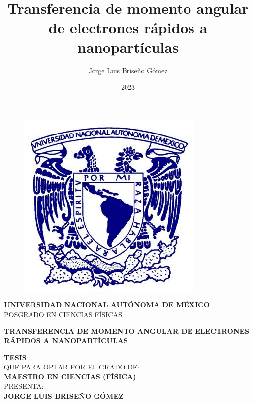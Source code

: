 \documentclass[11pt,twoside]{book}
\date{2023}
\title{ Transferencia de momento angular de electrones rápidos a nanopartículas}
\author{Jorge Luis Briseño Gómez}
\begin{document}
\begin{toexclude}
%
\begin{titlepage}
	\begin{center}
		
		\begin{figure}
			\centering
			\includegraphics[scale=.4]{17-imagenes/Unam.png}
		\end{figure}
		
		\begin{spacing}{1.5}
			\textbf{\large UNIVERSIDAD NACIONAL AUT\'ONOMA DE M\'EXICO}\\[-0.2cm]
			{\large POSGRADO EN CIENCIAS F\'ISICAS}
		\end{spacing}
		
		\vfill
		
		\begin{spacing}{1.5}
			\textbf{\large TRANSFERENCIA DE MOMENTO ANGULAR DE ELECTRONES R\'APIDOS A NANOPART\'ICULAS}
		\end{spacing}
		\vfill
		
		\begin{spacing}{1.2}
		    \textbf{\large TESIS}\\[0.2cm]
			{\large QUE PARA OPTAR POR EL GRADO DE:}\\ 
			\textbf{\large MAESTRO EN CIENCIAS (F\'ISICA)}\\
			\vspace*{\fill}
			{\large PRESENTA:}\\[0.2cm]
			\textbf{\large JORGE LUIS BRISEÑO GÓMEZ}
			\vspace*{\fill}
			

\end{spacing}
\end{center}
\end{titlepage}
\end{toexclude}
\end{document}
